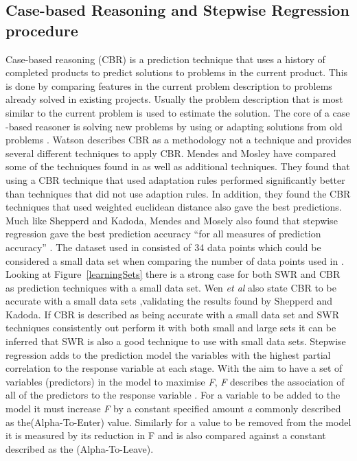 \documentclass[journal]{IEEEtran}
\begin{document}
\subsection{Case-based Reasoning and Stepwise Regression procedure}
Case-based reasoning (CBR) is a prediction technique that uses a history of completed products to predict solutions to problems in the current product. This is done by comparing features in the current problem description to problems already solved in existing projects. Usually the problem description that is most similar to the current problem is used to estimate the solution\cite{watson1998applying, mendes2002further}. The core of a case -based reasoner is solving new problems by using or adapting solutions from old problems \cite[p. 1]{riesbeck2013inside}. Watson \cite{watson1999case} describes CBR as a methodology not a technique and provides several different techniques to apply CBR. Mendes and Mosley\cite{mendes2002further} have compared some of the techniques found in \cite{watson1999case} as well as additional techniques. They found that using a CBR technique that used adaptation rules performed significantly better than techniques that did not use adaption rules. In addition, they found the CBR techniques that used weighted euclidean distance also gave the best predictions. Much like Shepperd and Kadoda\cite{shepperd2001comparing}, Mendes and Mosely\cite{mendes2002further} also found that stepwise regression gave the best prediction accuracy ``for all measures of prediction accuracy'' \cite[p. 11]{mendes2002further}. The dataset used in \cite{mendes2002further} consisted of 34 data points which could be considered a small data set when comparing the number of data points used in \cite{hazarika1998neural}. Looking at Figure~\ref{learningSets}  there is a strong case for both SWR and CBR as prediction techniques with a small data set. Wen \textit{et al}\cite{wen2012systematic} also state CBR to be accurate with a small data sets ,validating the results found by Shepperd and Kadoda\cite{shepperd2001comparing}. If CBR is described as being accurate with a small data set \cite{wen2012systematic} and SWR techniques consistently out perform it with both small and large sets \cite{shepperd2001comparing,mendes2002further}it can be inferred that SWR is also a good technique to use with small data sets. 
Stepwise regression adds to the prediction model the variables with the highest partial correlation to the response variable at each stage\cite{schroeder2016understanding}. With the aim to have a set of variables (predictors) in the model to maximise \textit{F}, \textit{F} describes the association of all of the predictors to the response variable \cite{schroeder2016understanding}. For a variable to be added to the model it must increase \textit{F} by a constant specified amount \textit{a} commonly described as the(Alpha-To-Enter) value. Similarly for a value to be removed from the model it is measured by its reduction in F and is also compared against a constant described as the (Alpha-To-Leave).
\end{document}
